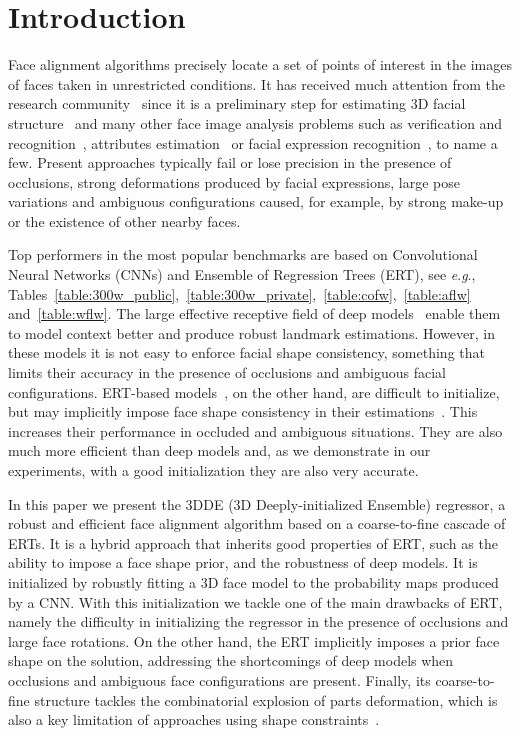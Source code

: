 \documentclass[11pt,twocolumn]{article}
\newcommand{\eg}{\textit{e}.\textit{g}., }
\begin{document}
\section{Introduction}\label{sec:introduction}
Face alignment algorithms precisely locate a set of points of interest in the images of faces taken in unrestricted conditions. It has received much attention from the research community~\citep{Jin17} since it is a preliminary step for estimating 3D facial structure~\citep{Zhao16} and many other face image analysis problems such as verification and recognition~\citep{Soltanpour17}, attributes estimation~\citep{Bekios14} or facial expression recognition~\citep{Martinez12}, to name a few. Present approaches typically fail or lose precision in the presence of occlusions, strong deformations produced by facial expressions, large pose variations and ambiguous configurations caused, for example, by strong make-up or the existence of other nearby faces.

Top performers in the most popular benchmarks are based on Convolutional Neural Networks (CNNs) and Ensemble of Regression Trees (ERT), see \eg Tables~\ref{table:300w_public},~\ref{table:300w_private},~\ref{table:cofw},~\ref{table:aflw} and~\ref{table:wflw}. The large effective receptive field of deep models~\citep{Kowalski17,Lv17,Xiao16,Yang17,Wu18} enable them to model context better and produce robust landmark estimations.
However, in these models it is not easy to enforce facial shape consistency, something that limits their accuracy in the presence of occlusions and ambiguous facial configurations. ERT-based models~\citep{Burgos13,Cao14,Kazemi14,Lee15b,Ren16}, on the other hand, are difficult to initialize, but may implicitly impose face shape consistency in their estimations~\citep{Cao14}. This increases their performance in occluded and ambiguous situations. They are also much more efficient than deep models and, as we demonstrate in our experiments, with a good initialization they are also very accurate.

In this paper we present the 3DDE (3D Deeply-initialized Ensemble) regressor, a robust and efficient face alignment algorithm based on a coarse-to-fine cascade of ERTs. It is a hybrid approach that inherits good properties of ERT,  
such as the ability to impose a face shape prior, and the robustness of deep models. It is initialized by robustly fitting a 3D face model to the probability maps produced by a CNN. With this initialization we tackle one of the main drawbacks of ERT, namely the difficulty in initializing the regressor in the presence of occlusions and large face rotations. On the other hand, the ERT implicitly imposes a prior face shape on the solution, addressing the shortcomings of deep models when occlusions and ambiguous face configurations are present. Finally, its coarse-to-fine structure tackles the combinatorial explosion of parts deformation, which is also a key limitation of approaches using shape constraints~\citep{Cao14}.
\end{document}
